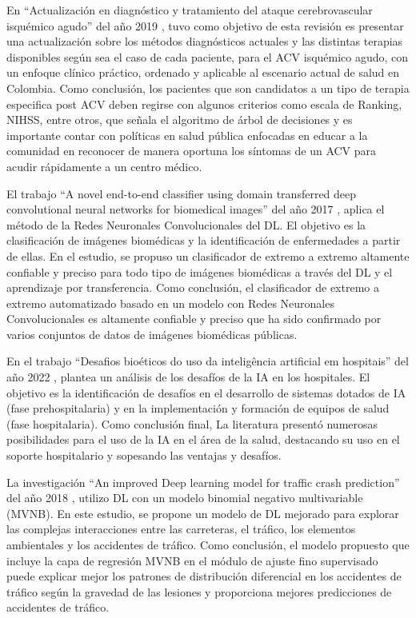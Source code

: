 \par En “Actualización en diagnóstico y tratamiento del ataque cerebrovascular isquémico agudo” del año 2019 \cite{Garcia2019}, tuvo como objetivo de esta revisión es presentar una actualización sobre los métodos diagnósticos actuales  y  las  distintas  terapias  disponibles según  sea  el  caso  de  cada  paciente,  para  el ACV isquémico agudo, con un enfoque clínico práctico, ordenado y aplicable al escenario actual de salud en Colombia. Como conclusión, los pacientes que son candidatos a un tipo de terapia especifica post ACV deben regirse con algunos criterios como escala de Ranking, NIHSS, entre otros, que señala el algoritmo de árbol de decisiones y es importante contar con políticas en salud pública enfocadas en educar a la comunidad en reconocer de manera oportuna los síntomas de un ACV para acudir rápidamente a un centro médico.\\
\par El trabajo “A novel end-to-end classifier using domain transferred deep convolutional neural networks for biomedical images” del año 2017 \cite{Pang2017}, aplica el método de la Redes Neuronales Convolucionales del DL. El objetivo es la clasificación de imágenes biomédicas y la identificación de enfermedades a partir de ellas. En el estudio, se propuso un clasificador de extremo a extremo altamente confiable y preciso para todo tipo de imágenes biomédicas a través del DL y el aprendizaje por transferencia. Como conclusión, el clasificador de extremo a extremo automatizado basado en un modelo con Redes Neuronales Convolucionales es altamente confiable y preciso que ha sido confirmado por varios conjuntos de datos de imágenes biomédicas públicas.\\
\par En el trabajo “Desafios bioéticos do uso da inteligência artificial em hospitais” del año 2022 \cite{Bioetica2022}, plantea un análisis de los desafíos de la IA en los hospitales. El objetivo es la identificación de desafíos en el desarrollo de sistemas dotados de IA (fase prehospitalaria) y en la implementación y formación de equipos de salud (fase hospitalaria). Como conclusión final, La literatura presentó numerosas posibilidades para el uso de la IA en el área de la salud, destacando su uso en el soporte hospitalario y sopesando las ventajas y desafíos.\\
\par La investigación “An improved Deep learning model for traffic crash prediction” del año 2018 \cite{shao2018improved}, utilizo DL con un modelo binomial negativo multivariable (MVNB). En este estudio, se propone un modelo de DL mejorado para explorar las complejas interacciones entre las carreteras, el tráfico, los elementos ambientales y los accidentes de tráfico. Como conclusión, el modelo propuesto que incluye la capa de regresión MVNB en el módulo de ajuste fino supervisado puede explicar mejor los patrones de distribución diferencial en los accidentes de tráfico según la gravedad de las lesiones y proporciona mejores predicciones de accidentes de tráfico.\\

